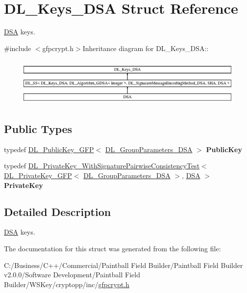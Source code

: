 \hypertarget{struct_d_l___keys___d_s_a}{
\section{DL\_\-Keys\_\-DSA Struct Reference}
\label{struct_d_l___keys___d_s_a}
}


\hyperlink{struct_d_s_a}{DSA} keys.  


{\ttfamily \#include $<$gfpcrypt.h$>$}Inheritance diagram for DL\_\-Keys\_\-DSA::\begin{figure}[H]
\begin{center}
\leavevmode
\includegraphics[height=2.42775cm]{struct_d_l___keys___d_s_a}
\end{center}
\end{figure}
\subsection*{Public Types}
\begin{DoxyCompactItemize}
\item 
\hypertarget{struct_d_l___keys___d_s_a_aea280ea56c7315eaa703f51af14ead41}{
typedef \hyperlink{class_d_l___public_key___g_f_p}{DL\_\-PublicKey\_\-GFP}$<$ \hyperlink{class_d_l___group_parameters___d_s_a}{DL\_\-GroupParameters\_\-DSA} $>$ {\bfseries PublicKey}}
\label{struct_d_l___keys___d_s_a_aea280ea56c7315eaa703f51af14ead41}

\item 
\hypertarget{struct_d_l___keys___d_s_a_a1f049db2cc5dd0208ff4ccbb65ad18a7}{
typedef \hyperlink{class_d_l___private_key___with_signature_pairwise_consistency_test}{DL\_\-PrivateKey\_\-WithSignaturePairwiseConsistencyTest}$<$ \hyperlink{class_d_l___private_key___g_f_p}{DL\_\-PrivateKey\_\-GFP}$<$ \hyperlink{class_d_l___group_parameters___d_s_a}{DL\_\-GroupParameters\_\-DSA} $>$, \hyperlink{struct_d_s_a}{DSA} $>$ {\bfseries PrivateKey}}
\label{struct_d_l___keys___d_s_a_a1f049db2cc5dd0208ff4ccbb65ad18a7}

\end{DoxyCompactItemize}


\subsection{Detailed Description}
\hyperlink{struct_d_s_a}{DSA} keys. 

The documentation for this struct was generated from the following file:\begin{DoxyCompactItemize}
\item 
C:/Business/C++/Commercial/Paintball Field Builder/Paintball Field Builder v2.0.0/Software Development/Paintball Field Builder/WSKey/cryptopp/inc/\hyperlink{gfpcrypt_8h}{gfpcrypt.h}\end{DoxyCompactItemize}
